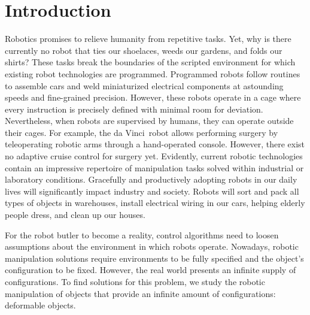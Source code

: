 \documentclass[\home/main.tex]{subfiles}
\begin{document}
\chapter{Introduction}\label{ch:introduction}

Robotics promises to relieve humanity from repetitive tasks. Yet, why is there currently no robot that ties our shoelaces, weeds our gardens, and folds our shirts?
These tasks break the boundaries of the scripted environment for which existing robot technologies are programmed. Programmed robots follow routines to assemble cars and weld miniaturized electrical components at astounding speeds and fine-grained precision. However, these robots operate in a cage where every instruction is precisely defined with minimal room for deviation. Nevertheless, when robots are supervised by humans, they can operate outside their cages. For example, the da Vinci\textregistered\ robot allows performing surgery by teleoperating robotic arms through a hand-operated console. However, there exist no adaptive cruise control for surgery yet.
Evidently, current robotic technologies contain an impressive repertoire of manipulation tasks solved within industrial or laboratory conditions.
Gracefully and productively adopting robots in our daily lives will significantly impact industry and society. Robots will sort and pack all types of objects in warehouses, install electrical wiring in our cars, helping elderly people dress, and clean up our houses.

For the robot butler to become a reality, control algorithms need to loosen assumptions about the environment in which robots operate. Nowadays, robotic manipulation solutions require environments to be fully specified and the object's configuration to be fixed. However, the real world presents an infinite supply of configurations. To find solutions for this problem, we study the robotic manipulation of objects that provide an infinite amount of configurations: deformable objects.
\end{document}
